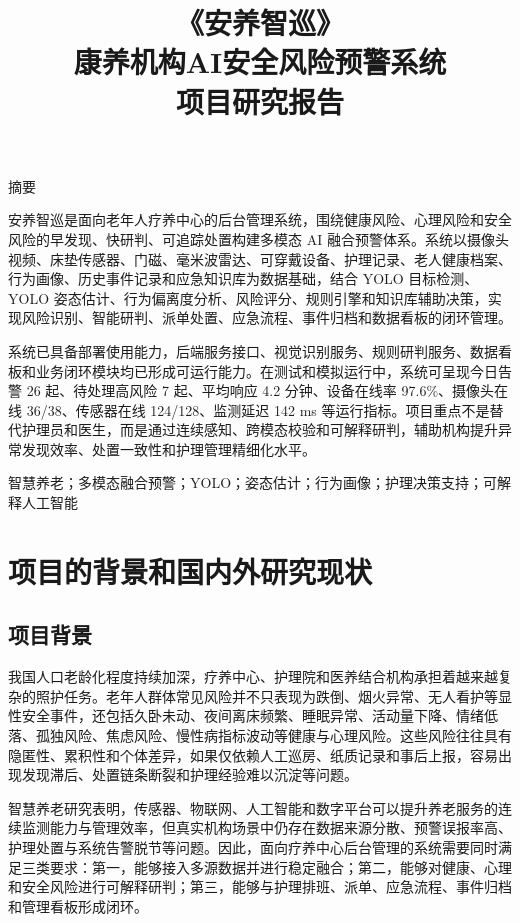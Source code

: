 \documentclass[UTF8,a4paper,zihao=-4,fontset=fandol]{ctexart}
\title{\xbs\zihao{3}《安养智巡》\\[0.45em]
{\heiti\zihao{4} 康养机构AI安全风险预警系统}\\[0.25em]
{\songti\zihao{-4} 项目研究报告}}
\author{}
\date{}
\begin{document}
\setlength{\baselineskip}{24pt}

\maketitle

{}
\begin{center}
{\heiti{} 摘要}
\end{center}

安养智巡是面向老年人疗养中心的后台管理系统，围绕健康风险、心理风险和安全风险的早发现、快研判、可追踪处置构建多模态 AI 融合预警体系。系统以摄像头视频、床垫传感器、门磁、毫米波雷达、可穿戴设备、护理记录、老人健康档案、行为画像、历史事件记录和应急知识库为数据基础，结合 YOLO 目标检测、YOLO 姿态估计、行为偏离度分析、风险评分、规则引擎和知识库辅助决策，实现风险识别、智能研判、派单处置、应急流程、事件归档和数据看板的闭环管理。

系统已具备部署使用能力，后端服务接口、视觉识别服务、规则研判服务、数据看板和业务闭环模块均已形成可运行能力。在测试和模拟运行中，系统可呈现今日告警 26 起、待处理高风险 7 起、平均响应 4.2 分钟、设备在线率 97.6\%、摄像头在线 36/38、传感器在线 124/128、监测延迟 142 ms 等运行指标。项目重点不是替代护理员和医生，而是通过连续感知、跨模态校验和可解释研判，辅助机构提升异常发现效率、处置一致性和护理管理精细化水平。

智慧养老；多模态融合预警；YOLO；姿态估计；行为画像；护理决策支持；可解释人工智能

\newpage
\tableofcontents
\newpage

\section{项目的背景和国内外研究现状}

\subsection{项目背景}

我国人口老龄化程度持续加深，疗养中心、护理院和医养结合机构承担着越来越复杂的照护任务。老年人群体常见风险并不只表现为跌倒、烟火异常、无人看护等显性安全事件，还包括久卧未动、夜间离床频繁、睡眠异常、活动量下降、情绪低落、孤独风险、焦虑风险、慢性病指标波动等健康与心理风险。这些风险往往具有隐匿性、累积性和个体差异，如果仅依赖人工巡房、纸质记录和事后上报，容易出现发现滞后、处置链条断裂和护理经验难以沉淀等问题。

智慧养老研究表明，传感器、物联网、人工智能和数字平台可以提升养老服务的连续监测能力与管理效率，但真实机构场景中仍存在数据来源分散、预警误报率高、护理处置与系统告警脱节等问题。因此，面向疗养中心后台管理的系统需要同时满足三类要求：第一，能够接入多源数据并进行稳定融合；第二，能够对健康、心理和安全风险进行可解释研判；第三，能够与护理排班、派单、应急流程、事件归档和管理看板形成闭环。
\end{document}
